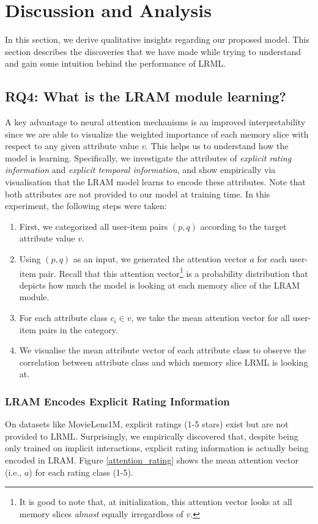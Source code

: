 \documentclass[sigconf]{acmart}
\begin{document}
\section{Discussion and Analysis}
In this section, we derive qualitative insights regarding our proposed model. This section describes the discoveries that we have made while trying to understand and gain some intuition behind the performance of \textsc{LRML}.

\subsection{RQ4: What is the LRAM module learning?}
A key advantage to neural attention mechanisms is an improved interpretability since we are able to visualize the weighted importance of each memory slice with respect to any given attribute value $v$. This helps us to understand how the model is learning. Specifically, we investigate the attributes of \textit{explicit rating information} and \textit{explicit temporal information}, and show empirically via visualisation that the LRAM model learns to encode these attributes. Note that both attributes are not provided to our model at training time. In this experiment, the following steps were taken:
\begin{enumerate}
\item First, we categorized all user-item pairs $(p,q)$ according to the target attribute value $v$.
\item Using $(p,q)$ as an input, we generated the attention vector $a$ for each user-item pair. Recall that this attention vector\footnote{It is good to note that, at initialization, this attention vector looks at all memory slices \textit{almost} equally irregardless of $v$.}  is a probability distribution that depicts how much the model is looking at each memory slice of the LRAM module. 
\item For each attribute class $c_i \in v$, we take the mean attention vector for all user-item pairs in the category. 
\item We visualise the mean attribute vector of each attribute class to observe the correlation between attribute class and which memory slice \textsc{LRML} is looking at. 
\end{enumerate}


\subsubsection{LRAM Encodes Explicit Rating Information}
On datasets like MovieLens1M, explicit ratings (1-5 stars) exist but are not provided to \textsc{LRML}. Surprisingly, we empirically discovered that, despite being only trained on implicit interactions, explicit rating information is actually being encoded in LRAM. Figure \ref{attention_rating} shows the mean attention vector (i.e., $a$) for each rating class (1-5).
\end{document}
